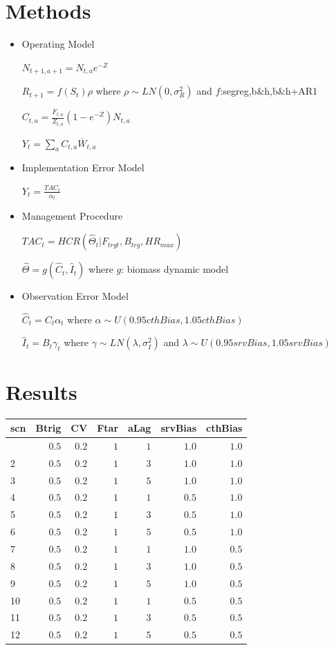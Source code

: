 \documentclass[a4paper]{article}
\begin{document}
\section{Methods}

\begin{itemize}
	\item Operating Model

	$N_{t+1,a+1}=N_{t,a}e^{-Z}$
	
	$R_{t+1}=f(S_{t})\rho$ where $\rho \sim LN(0,\sigma_{R}^2)$ and $f$:{segreg,b\&h,b\&h+AR1}

	$C_{t,a}=\frac{F_{t,a}}{Z_{t,a}}(1-e^{-Z})N_{t,a}$
	
	$Y_{t}=\sum_a C_{t,a}\bar{W}_{t,a}$
	
	\item Implementation Error Model
	
	$Y_{t}=\frac{TAC_{t}}{\alpha_{t}}$

	\item Management Procedure
	
	$TAC_{t}=HCR(\hat{\Theta}_{t} | F_{trgt}, B_{trg}, HR_{max})$
	
	$\hat{\Theta}=g(\hat{C}_{t}, \hat{I}_{t})$ where $g$: biomass dynamic model 
	
	\item Observation Error Model
	
	$\hat{C}_{t}=C_{t} \alpha_{t}$ where $\alpha \sim U(0.95cthBias, 1.05cthBias)$
	
	$\hat{I}_{t} = B_{t} \gamma_{t}$ where $\gamma \sim LN(\lambda, \sigma_{I}^2)$ and $\lambda \sim U(0.95srvBias, 1.05srvBias)$	
		
\end{itemize}	

\section{Results}

\begin{table}[h]
\caption{Simulation scenarios}
%

\setlongtables


\begin{longtable}{lrrrrrr}
\hline
\multicolumn{1}{l}{scn}&\multicolumn{1}{c}{Btrig}&\multicolumn{1}{c}{CV}&\multicolumn{1}{c}{Ftar}&\multicolumn{1}{c}{aLag}&\multicolumn{1}{c}{srvBias}&\multicolumn{1}{c}{cthBias}\tabularnewline
\hline
\endhead
\hline
\endfoot
1&$0.5$&$0.2$&$1$&$1$&$1.0$&$1.0$\tabularnewline
2&$0.5$&$0.2$&$1$&$3$&$1.0$&$1.0$\tabularnewline
3&$0.5$&$0.2$&$1$&$5$&$1.0$&$1.0$\tabularnewline
4&$0.5$&$0.2$&$1$&$1$&$0.5$&$1.0$\tabularnewline
5&$0.5$&$0.2$&$1$&$3$&$0.5$&$1.0$\tabularnewline
6&$0.5$&$0.2$&$1$&$5$&$0.5$&$1.0$\tabularnewline
7&$0.5$&$0.2$&$1$&$1$&$1.0$&$0.5$\tabularnewline
8&$0.5$&$0.2$&$1$&$3$&$1.0$&$0.5$\tabularnewline
9&$0.5$&$0.2$&$1$&$5$&$1.0$&$0.5$\tabularnewline
10&$0.5$&$0.2$&$1$&$1$&$0.5$&$0.5$\tabularnewline
11&$0.5$&$0.2$&$1$&$3$&$0.5$&$0.5$\tabularnewline
12&$0.5$&$0.2$&$1$&$5$&$0.5$&$0.5$\tabularnewline
\hline
\end{longtable}\end{table}
\end{document}
